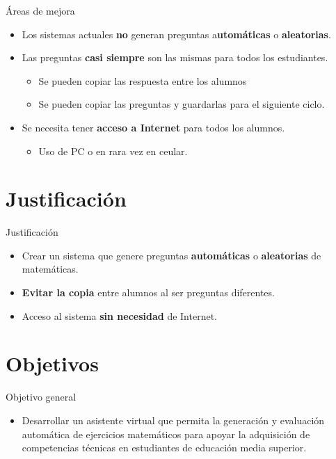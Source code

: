 \begin{frame}[c]{Áreas de mejora}
  \begin{itemize}
    \item Los sistemas actuales \textbf{no} generan preguntas
        a\textbf{utomáticas} o \textbf{aleatorias}.
    \pausa
    \item Las preguntas \textbf{casi siempre} son las mismas para
        todos los estudiantes.
    \begin{itemize}
      \item Se pueden copiar las respuesta entre los alumnos
      \item Se pueden copiar las preguntas y guardarlas para
          el siguiente ciclo.
    \end{itemize}
    \pausa
    \item Se necesita tener \textbf{acceso a Internet} para todos
        los alumnos.
    \begin{itemize}
      \item Uso de PC o en rara vez en ceular.
    \end{itemize}
  \end{itemize}
\end{frame}

\section{Justificación}

\begin{frame}[c]{Justificación}
  \begin{itemize}
    \item Crear un sistema que genere preguntas \textbf{automáticas} o
        \textbf{aleatorias} de matemáticas.
    \pausa
    \item \textbf{Evitar la copia} entre alumnos al ser preguntas
        diferentes.
    \pausa
    \item Acceso al sistema \textbf{sin necesidad} de Internet.
  \end{itemize}
\end{frame}

\section{Objetivos}

\begin{frame}[c]{Objetivo general}
  \begin{itemize}
    \item Desarrollar un asistente virtual que permita la generación
      y evaluación automática de ejercicios matemáticos para apoyar
      la adquisición de competencias técnicas en estudiantes de
      educación media superior.
  \end{itemize}
\end{frame}

